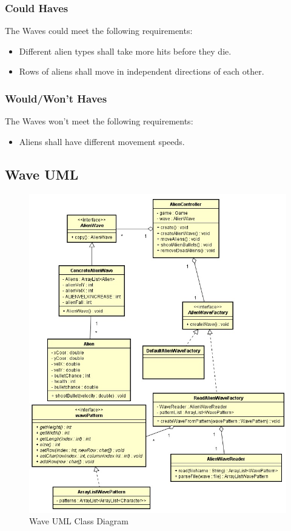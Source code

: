 \documentclass[10pt]{article}
\begin{document}
\subsubsection{Could Haves}
The Waves could meet the following requirements:
\begin{itemize}
	\item Different alien types shall take more hits before they die.
	\item Rows of aliens shall move in independent directions of each other.
\end{itemize}
\subsubsection{Would/Won't Haves}
The Waves won't meet the following requirements:
\begin{itemize}
	\item Aliens shall have different movement speeds.
\end{itemize}
\newpage
\subsection{Wave UML}
\begin{figure}[ht!]
\centering
\includegraphics[width=14cm]{waveUML.jpg}
\caption{Wave UML Class Diagram}
\end{figure}
\end{document}
